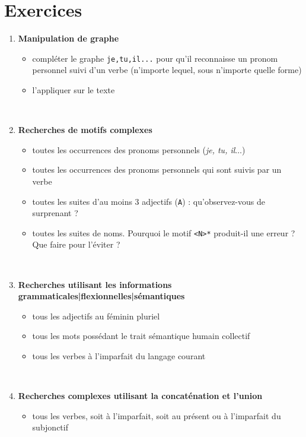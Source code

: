 \documentclass[xcolor={table,usenames,dvipsnames}]{article}
\begin{document}
\section{Exercices}
\begin{enumerate}
	\item \textbf{Manipulation de graphe}
	\begin{itemize}
		\item compléter le graphe \texttt{je,tu,il...} pour qu'il reconnaisse un pronom personnel suivi d'un verbe (n'importe lequel, sous n'importe quelle forme)
		\item l'appliquer sur le texte
	\end{itemize}
	\\
	\bigskip
\item \textbf{Recherches de motifs complexes}
	\begin{itemize}
		\item toutes les occurrences des pronoms personnels (\textit{je, tu, il$\dots$})
		\item toutes les occurrences des pronoms personnels qui sont suivis par un verbe
		\item toutes les suites d'au moins 3 adjectifs (\texttt{A}) : qu'observez-vous de surprenant ?
		\item toutes les suites de noms. Pourquoi le motif \texttt{<N>*} produit-il une erreur ? Que faire pour l'éviter ?
	\end{itemize}
	\\
	\bigskip
	
	\item \textbf{Recherches utilisant les informations grammaticales|flexionnelles|sémantiques}
	\begin{itemize}
		\item tous les adjectifs au féminin pluriel
		\item tous les mots possédant le trait sémantique \og{}humain collectif\fg{}
		\item tous les verbes à l'imparfait du langage courant
	\end{itemize}
	
		\\
	\bigskip
	
	\item \textbf{Recherches complexes utilisant la concaténation et l'union}
	\begin{itemize}
		\item tous les verbes, soit à l'imparfait, soit au présent ou à l'imparfait du subjonctif
	\end{itemize}
	\\
	\bigskip


\end{enumerate}
\end{document}
